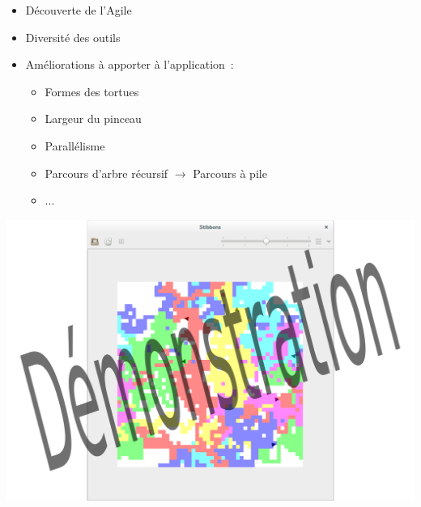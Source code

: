 \begin{frame}
\begin{itemize}
\item Découverte de l'Agile
\item Diversité des outils
\item Améliorations à apporter à l'application~:
	\begin{itemize}
	\item Formes des tortues
	\item Largeur du pinceau
	\item Parallélisme
	\item Parcours d'arbre récursif $\rightarrow$ Parcours à pile
	\item ...
	\end{itemize}
\end{itemize}
\end{frame}

\begin{frame}
\includegraphics[scale=0.3]{doc/Presentation/image/demo.pdf}
\end{frame}
